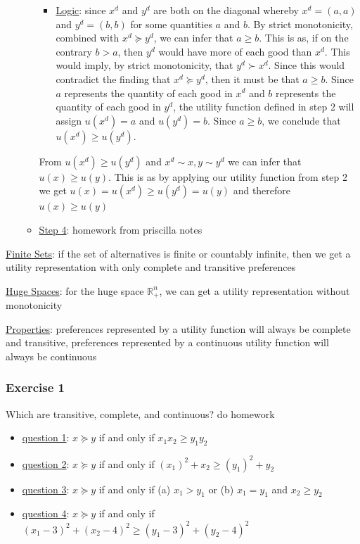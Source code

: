 \documentclass{article}
\begin{document}
\begin{itemize}
\begin{itemize}
      \begin{itemize}
        \item  \underline{Logic}: since $x^{d}$ and $y^{d}$ are both on the diagonal whereby $x^{d} = (a, a)$ and $y^{d} = (b,b)$ for some quantities $a$ and $b$. By strict monotonicity, combined with $x^{d} \succeq y^{d}$, we can infer that $a \geq b$. This is as, if on the contrary $b > a$, then $y^{d}$ would have more of each good than $x^{d}$. This would imply, by strict monotonicity, that $y^{d} \succ  x^{d}$. Since this would contradict the finding that $x^{d} \succeq y^{d}$, then it must be that $a \geq b$. Since $a$ represents the quantity of each good in $x^{d}$ and $b$ represents the quantity of each good in $y^{d}$, the utility function defined in step 2 will assign $u(x^{d}) = a$ and $u(y^{d}) = b$. Since $a \geq b$, we conclude that $u(x^{d}) \geq u(y^{d})$.
      \end{itemize}
      From $u(x^{d}) \geq u(y^{d})$ and $x^{d} \sim x, y \sim y^{d}$ we can infer that $u(x) \geq u(y)$. This is as by applying our utility function from step 2 we get $u(x) = u(x^{d}) \geq u(y^{d}) = u(y)$ and therefore $u(x) \geq u(y)$
      \item  \underline{Step 4}: \begingroup\color{blue} homework from priscilla notes \endgroup
    \end{itemize}
  \end{itemize}
  \par
  \underline{Finite Sets}: if the set of alternatives is finite or countably infinite, then we get a utility representation with only complete and transitive preferences \par
  \underline{Huge Spaces}: for the huge space $\mathbb{R}^{n}_{+}$, we can get a utility representation without monotonicity \par
  \underline{Properties}: preferences represented by a utility function will always be complete and transitive, preferences represented by a continuous utility function will always be continuous \par
\vspace{6mm}
\subsubsection{Exercise 1}
Which are transitive, complete, and continuous? \begingroup\color{blue} do homework \endgroup
  \begin{itemize}
    \item  \underline{question 1}: $x \succeq y$ if and only if $x_{1}x_{2} \geq y_{1}y_{2}$
    \item  \underline{question 2}: $x \succeq y$ if and only if $(x_{1})^{2} + x_{2} \geq (y_{1})^{2} + y_{2}$
    \item  \underline{question 3}: $x \succeq y$ if and only if (a) $x_{1} > y_{1}$ or (b) $x_{1} = y_{1}$ and $x_{2} \geq y_{2}$
    \item  \underline{question 4}: $x \succeq y$ if and only if $(x_{1} - 3)^{2} + (x_{2} - 4)^{2} \geq (y_{1} - 3)^{2} + (y_{2}-4)^{2}$
  \end{itemize}
\end{document}
